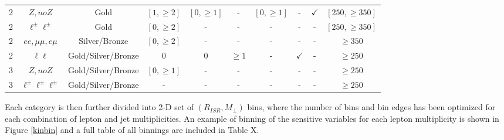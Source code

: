 \begin{table}
\begin{adjustwidth}{-0.7in}{-1in}
\begin{tabular}{|c|c|c|c|c|c|c|c|c|c|}
2 & $Z, no Z$ & Gold & $[1,\geq 2]$ & $[0, \geq 1]$& - & $[0,\geq 1]$ & - & $\checkmark$ & $[250,\geq350]$  \\
2 & $\ell^\pm \ell^\pm$ & Gold & $[0,\geq 2]$ & - & - &  - & - & - & $[250,\geq350]$ \\
2 & $ee, \mu\mu, e\mu$ & Silver/Bronze & $[0,\geq 2]$ & - & - & - & - & - & $\geq350$ \\
2 & $\ell \ell$ & Gold/Silver/Bronze & 0 & 0 & $\geq 1 $ & - & $\checkmark$ & - & $\geq 250$\\
\hline
3 & $Z, no Z$ & Gold/Silver/Bronze & $[0,\geq 1]$ & - & - & - & - & - & $\geq 250$ \\
3 & $\ell^\pm \ell^\pm \ell^\pm$ & Gold/Silver/Bronze & - & - & -& - & - & -& $\geq 250$ \\
\hline
\end{tabular} 
\end{adjustwidth}
\end{table}



Each category is then further divided into 2-D set of $(R_{ISR}, M_\perp)$ bins, where the number of bins and bin edges has been optimized for each combination of lepton and jet multiplicities. An example of binning of the sensitive variables for each lepton multiplicity is shown in Figure \ref{kinbin} and a full table of all binnings are included in Table X.

